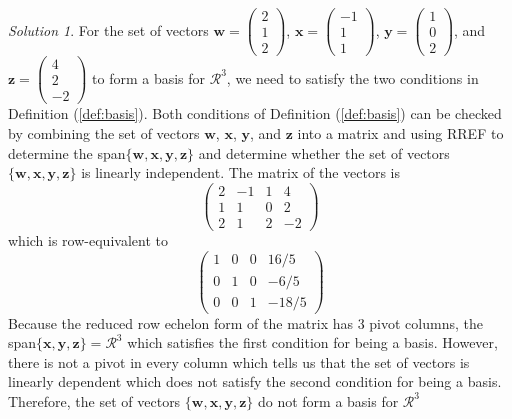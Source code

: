 \documentclass[
]{book}
\theoremstyle{definition}
\theoremstyle{definition}
\theoremstyle{definition}
\theoremstyle{remark}
\newtheorem*{solution}{Solution}
\begin{document}
\begin{solution}

For the set of vectors \(\mathbf{w} = \begin{pmatrix} 2 \\ 1 \\ 2 \end{pmatrix}\), \(\mathbf{x} = \begin{pmatrix} -1 \\ 1 \\ 1 \end{pmatrix}\), \(\mathbf{y} = \begin{pmatrix} 1 \\ 0 \\ 2 \end{pmatrix}\), and \(\mathbf{z} = \begin{pmatrix} 4 \\ 2 \\ -2 \end{pmatrix}\) to form a basis for \(\mathcal{R}^3\), we need to satisfy the two conditions in Definition (\ref{def:basis}). Both conditions of Definition (\ref{def:basis}) can be checked by combining the set of vectors \(\mathbf{w}\), \(\mathbf{x}\), \(\mathbf{y}\), and \(\mathbf{z}\) into a matrix and using RREF to determine the span\(\{ \mathbf{w}, \mathbf{x}, \mathbf{y}, \mathbf{z} \}\) and determine whether the set of vectors \(\{ \mathbf{w}, \mathbf{x}, \mathbf{y}, \mathbf{z} \}\) is linearly independent. The matrix of the vectors is
\[
\begin{pmatrix} 2 & -1 & 1 & 4 \\ 1 & 1 & 0 & 2 \\ 2 & 1 & 2 & -2 \end{pmatrix}
\]
which is row-equivalent to
\[
\begin{pmatrix} 1 & 0 & 0 & 16/5 \\ 0 & 1 & 0 & -6/5 \\ 0 & 0 & 1 & -18/5 \end{pmatrix}
\]
Because the reduced row echelon form of the matrix has 3 pivot columns, the span\(\{ \mathbf{x}, \mathbf{y}, \mathbf{z} \} = \mathcal{R}^3\) which satisfies the first condition for being a basis. However, there is not a pivot in every column which tells us that the set of vectors is linearly dependent which does not satisfy the second condition for being a basis. Therefore, the set of vectors \(\{ \mathbf{w}, \mathbf{x}, \mathbf{y}, \mathbf{z} \}\) do not form a basis for \(\mathcal{R}^3\)


\end{solution}
\end{document}
